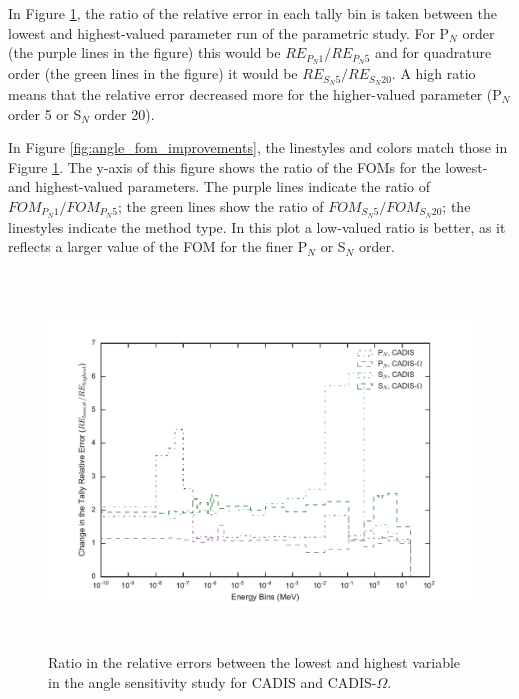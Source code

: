 In Figure
\ref{fig:angle_err_improvements}, the ratio of the relative error in each tally
bin is taken between the lowest and highest-valued parameter run of the
parametric study. For P$_N$ order (the purple lines in the figure)
this would be $RE_{P_N 1}/RE_{P_N 5}$ and for
quadrature order (the green lines in the figure) it would be $RE_{S_N 5}/
RE_{S_N 20}$. A high ratio means that the relative error decreased more for
the higher-valued parameter (P$_N$ order 5 or S$_N$ order 20).

In Figure \ref{fig:angle_fom_improvements}, the linestyles and colors match
those in Figure \ref{fig:angle_err_improvements}. The y-axis of this figure
shows the ratio of the FOMs for the lowest- and highest-valued parameters. The
purple lines indicate the ratio of $FOM_{P_N 1}/FOM_{P_N 5}$; the green lines
show the ratio of $FOM_{S_N 5}/FOM_{S_N 20}$; the linestyles indicate the method
type. In this plot a low-valued ratio is better, as it reflects a larger value
of the FOM for the finer P$_N$ or S$_N$ order.

\begin{figure}[h!]
  \centering
  \includegraphics[height=10cm]{./chapters/characterization_probs/figures/angle/prob_1/improvement_err_allmethds.pdf}
  \caption[Ratio in the relative errors between the lowest and highest variable in the angle
  sensitivity study for CADIS and CADIS-$\Omega$.]{Ratio in the relative errors between
    the lowest and highest variable in the angle sensitivity study for CADIS and CADIS-$\Omega$.}
  \label{fig:angle_err_improvements}
\end{figure}

